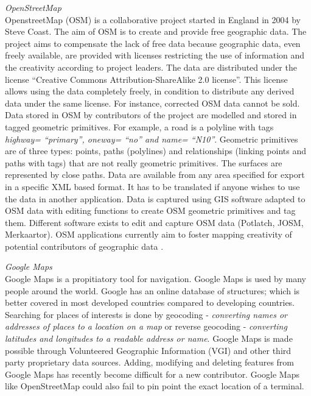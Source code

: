 \textit{OpenStreetMap}\\
OpenstreetMap (OSM) is a collaborative project started in England in 2004 by Steve Coast. The aim of OSM is to create and provide free geographic data. The project aims to compensate the lack of free data because geographic data, even freely available, are provided with licenses restricting the use of information and the creativity according to project leaders. The data are distributed under the license “Creative Commons Attribution-ShareAlike 2.0 license”. This license allows using the data completely freely, in condition to distribute any derived data under the same license. For instance, corrected OSM data cannot be sold.
Data stored in OSM by contributors of the project are modelled and stored in tagged geometric primitives. For example, a road is a polyline with tags \textit{highway= “primary”, oneway= “no” and name= “N10”}. Geometric primitives are of three types: points, paths (polylines) and relationships (linking points and paths with tags) that are not really geometric primitives. The surfaces are represented by close paths. Data are available from any area specified for export in a specific XML based format. It has to be translated if anyone wishes to use the data in another application. Data is captured using GIS software adapted to OSM data with editing functions to create OSM geometric primitives and tag them. Different software exists to edit and capture OSM data (Potlatch, JOSM, Merkaartor). OSM applications currently aim to foster mapping creativity of potential contributors of geographic data \citep{girres_quality_2010}.

\textit{Google Maps}\\
Google Maps is a propitiatory tool for navigation. Google Maps is used by many people around the world. Google has an online database of structures; which is better covered in most developed countries compared to developing countries. Searching for places of interests is done by geocoding - \textit{converting names or addresses of places to a location on a map} or reverse geocoding - \textit{converting latitudes and longitudes to a readable address or name}. Google Maps is made possible through Volunteered Geographic Information (VGI) and other third party proprietary data sources. Adding, modifying and deleting features from Google Maps has recently become difficult for a new contributor. Google Maps like OpenStreetMap could also fail to pin point the exact location of a terminal.


